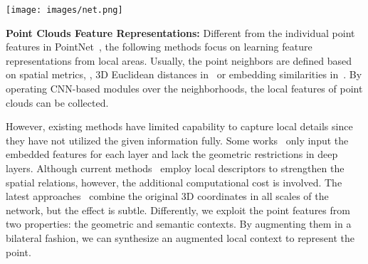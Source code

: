 \documentclass[10pt,twocolumn,letterpaper]{article}
\def\ourencoder{Bilateral Context Module}
\def\ourblock{Bilateral Context Block}
\def\ourblocks{Bilateral Context Blocks}
\def\ourdecoder{Adaptive Fusion Module}
\begin{document}
\begin{figure*}
\begin{center}
\texttt{[image: images/net.png]}
\end{center}
\vspace{-5mm}
\captionsetup{font=small}
\caption{The details of our semantic segmentation network and the Bilateral Context Block (the annotations are consistent with the items in Sec.~\ref{sec:metho_cross}). Firstly, the Feature Extractor (Sec.~\ref{sec:impl_extractor}) captures the preliminary semantic context $\mathcal{F}$ from the input data. Then, the \ourencoder~(\ie, a series of the \ourblocks) augments the local context of multiple point cloud resolutions. Generally, the \ourblock~requires both semantic and geometric context as bilateral inputs. In particular, the first block inputs the preliminary $\mathcal{F}$ and the original 3D coordinates $\mathcal{P}$; while each of the others inputs its previous one's downsampled output and coordinates $\mathcal{P}$, as the semantic and geometric context respectively. Afterward, our \ourdecoder~(Sec.~\ref{sec:metho_fuse}) upsamples the \ourblocks' outputs, then adaptively fuses them as an output feature map. Finally, we predict semantic labels for all points via fully-connected layers.}
\label{fig:net}
\vspace{-3mm}
\end{figure*}
\vspace{1mm}
\noindent \textbf{Point Clouds Feature Representations:} 
Different from the individual point features in PointNet~\cite{qi2017pointnet}, the following methods focus on learning feature representations from local areas. Usually, the point neighbors are defined based on spatial metrics, \eg, 3D Euclidean distances in~\cite{qi2017pointnet++, liu2019relation, yan2020pointasnl, hu2020randla} or embedding similarities in~\cite{wang2019dynamic, qiu2019geometric, qiu2021dense}. By operating CNN-based modules over the neighborhoods, the local features of point clouds can be collected.

However, existing methods have limited capability to capture local details since they have not utilized the given information fully. Some works~\cite{qi2017pointnet, qi2017pointnet++, wang2019dynamic} only input the embedded features for each layer and lack the geometric restrictions in deep layers. Although current methods~\cite{liu2019relation,qiu2019geometric} employ local descriptors to strengthen the spatial relations, however, the additional computational cost is involved. The latest approaches~\cite{yan2020pointasnl, hu2020randla} combine the original 3D coordinates in all scales of the network, but the effect is subtle. Differently, we exploit the point features from two properties: the geometric and semantic contexts. By augmenting them in a bilateral fashion, we can synthesize an augmented local context to represent the point. 
\end{document}
